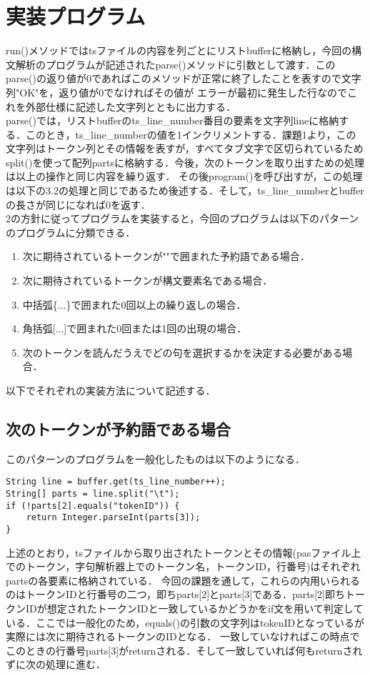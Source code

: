 \documentclass[dvipdfmx]{jarticle}
\begin{document}
\section{実装プログラム}
run()メソッドではtsファイルの内容を列ごとにリストbufferに格納し，今回の構文解析のプログラムが記述されたparse()メソッドに引数として渡す．このparse()の返り値が0であればこのメソッドが正常に終了したことを表すので文字列"OK"を，返り値が0でなければその値が
エラーが最初に発生した行なのでこれを外部仕様に記述した文字列とともに出力する．\\
parse()では，リストbufferのts\_line\_number番目の要素を文字列lineに格納する．このとき，ts\_line\_numberの値を1インクリメントする．課題1より，この文字列はトークン列とその情報を表すが，すべてタブ文字で区切られているため
split()を使って配列partsに格納する．今後，次のトークンを取り出すための処理は以上の操作と同じ内容を繰り返す．
その後program()を呼び出すが，この処理は以下の3.2の処理と同じであるため後述する．そして，ts\_line\_numberとbufferの長さが同じになれば0を返す．
\\2の方針に従ってプログラムを実装すると，今回のプログラムは以下のパターンのプログラムに分類できる．
\begin{enumerate}
  \item 次に期待されているトークンが""で囲まれた予約語である場合．
  \item 次に期待されているトークンが構文要素名である場合．
  \item 中括弧\{...\}で囲まれた0回以上の繰り返しの場合．
  \item 角括弧[...]で囲まれた0回または1回の出現の場合．
  \item 次のトークンを読んだうえでどの句を選択するかを決定する必要がある場合．
\end{enumerate}
以下でそれぞれの実装方法について記述する．
\subsection{次のトークンが予約語である場合}
このパターンのプログラムを一般化したものは以下のようになる．
\begin{lstlisting}
String line = buffer.get(ts_line_number++);
String[] parts = line.split("\t");
if (!parts[2].equals("tokenID")) {
    return Integer.parseInt(parts[3]); 
}
\end{lstlisting}
上述のとおり，tsファイルから取り出されたトークンとその情報(pasファイル上でのトークン，字句解析器上でのトークン名，トークンID，行番号)はそれぞれpartsの各要素に格納されている．
今回の課題を通して，これらの内用いられるのはトークンIDと行番号の二つ，即ちparts[2]とparts[3]である．parts[2]即ちトークンIDが想定されたトークンIDと一致しているかどうかをif文を用いて判定している．ここでは一般化のため，equals()の引数の文字列はtokenIDとなっているが実際には次に期待されるトークンのIDとなる．
一致していなければこの時点でこのときの行番号parts[3]がreturnされる．そして一致していれば何もreturnされずに次の処理に進む．
\end{document}
